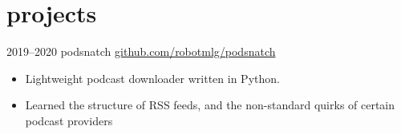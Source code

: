 \documentclass[]{friggeri-mlg-cv} %
\begin{document}
\section{projects}
\begin{entrylist}
\entry
{2019--2020}
{podsnatch}
{\href{https://github.com/robotmlg/podsnatch}{github.com/robotmlg/podsnatch}}
{
\begin{itemize}[leftmargin=*]
\item Lightweight podcast downloader written in Python. 
\item Learned the structure of RSS feeds, and the non-standard quirks of certain 
podcast providers
\end{itemize}
}

\end{entrylist}
\end{document}
